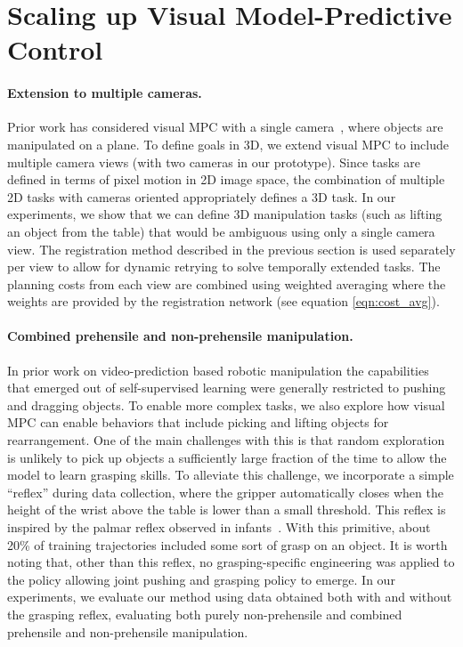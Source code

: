 \section{Scaling up Visual Model-Predictive Control}
\paragraph{Extension to multiple cameras.}
Prior work has considered visual MPC with a single camera~\cite{foresight,sna}, where objects are manipulated on a plane. To define goals in 3D, we extend visual MPC to include multiple camera views (with two cameras in our prototype). Since tasks are defined in terms of pixel motion in 2D image space, the combination of multiple 2D tasks with cameras oriented appropriately defines a 3D task. In our experiments, we show that we can define 3D manipulation tasks (such as lifting an object from the table) that would be ambiguous using only a single camera view. The registration method described in the previous section is used separately per view to allow for dynamic retrying to solve temporally extended tasks. The planning costs from each view are combined using weighted averaging where the weights are provided by the registration network (see equation \ref{eqn:cost_avg}). 

\vspace{-0.1in}
\paragraph{Combined prehensile and non-prehensile manipulation.}
In prior work on video-prediction based robotic manipulation \cite{sna, foresight} the capabilities that emerged out of self-supervised learning were generally restricted to pushing and dragging objects. To enable more complex tasks, we also explore how visual MPC can enable behaviors that include picking and lifting objects for rearrangement. One of the main challenges with this is that random exploration is unlikely to pick up objects a sufficiently large fraction of the time to allow the model to learn grasping skills. To alleviate this challenge, we incorporate a simple ``reflex'' during data collection, where the gripper automatically closes when the height of the wrist above the table is lower than a small threshold. This reflex is inspired by the palmar reflex observed in infants~\cite{grasping_fetal}. With this primitive, about 20\% of training trajectories included some sort of grasp on an object. It is worth noting that, other than this reflex, no grasping-specific engineering was applied to the policy allowing joint pushing and grasping policy to emerge. In our experiments, we evaluate our method using data obtained both with and without the grasping reflex, evaluating both purely non-prehensile and combined prehensile and non-prehensile manipulation.

